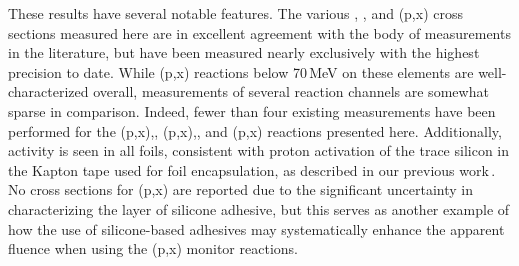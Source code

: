
% 



These results have several notable features.
The various , , and (p,x) cross sections measured here are in excellent agreement with the body of measurements in the literature,  but have been measured nearly exclusively with the highest precision to date.
While (p,x) reactions below 70\,MeV on these elements are well-characterized overall, measurements of several reaction channels are somewhat sparse in comparison.
Indeed, fewer than four existing measurements have been performed for the (p,x),, (p,x),, and (p,x)
reactions presented here.
Additionally,  activity is seen in all foils, consistent with proton activation of the trace  silicon in the Kapton tape used for foil encapsulation, as described in our previous work\,\cite{Voyles2018a}.
No cross sections for (p,x) are reported due to the significant uncertainty in characterizing the layer of silicone adhesive, but this serves as another example of how the use of silicone-based adhesives may systematically enhance the apparent fluence when using the (p,x) monitor reactions.


